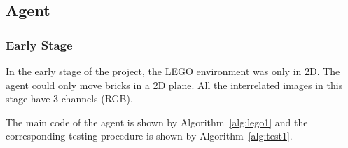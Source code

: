 \documentclass[a4paper]{article}
\begin{document}
            

        
        
        \subsection{Agent}
	        \subsubsection{Early Stage}
		        In the early stage of the project, the LEGO environment was only in 2D. The agent could only move bricks in a 2D plane. All the interrelated images in this stage have 3 channels (RGB).
		        
		        The main code of the agent is shown by Algorithm~\ref{alg:lego1} and the corresponding testing procedure is shown by Algorithm~\ref{alg:test1}. 
		        
\end{document}
